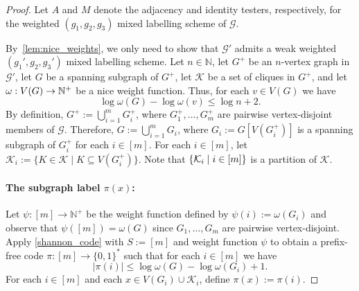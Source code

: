\documentclass{patmorin}
\renewcommand{\le}{\leqslant}
\newcommand{\NN}{\mathbb{N}}
\DeclarePairedDelimiter{\set}{\{}{\}}
\begin{document}
  \begin{proof}
    Let $A$ and $M$ denote the adjacency and identity testers, respectively, for the weighted $(g_1,g_2,g_3)$ mixed labelling scheme of $\mathcal{G}$.

    By~\cref{lem:nice_weights}, we only need to show that $\mathcal{G}'$ admits a weak weighted $(g_1',g_2,g_3')$ mixed labelling scheme.
    Let $n\in \NN$,
    let $G^+$ be an $n$-vertex graph in $\mathcal{G}'$,
    let $G$ be a spanning subgraph of $G^+$,
    let $\mathcal{K}$ be a set of cliques in $G^+$, and
    let $\omega:V(G)\to\mathbb{N}^+$ be a nice weight function.
    Thus, for each $v\in V(G)$ we have
    \begin{equation}
    \label{eq:nice}
    \log\omega(G)-\log\omega(v)\le\log n + 2.
    \end{equation}
    By definition, $G^+:=\bigcup_{i=1}^m G^+_i$, where $G^+_1,\ldots,G^+_m$ are pairwise vertex-disjoint members of $\mathcal{G}$.
    Therefore, $G:=\bigcup_{i=1}^m G_i$, where $G_i:=G[V(G^+_i)]$ is a spanning subgraph of $G^+_i$ for each $i\in[m]$.
    For each $i\in[m]$, let $\mathcal{K}_i:=\{K\in\mathcal{K}\mid K\subseteq V(G^+_i)\}$.
    Note that $\set{\mathcal{K}_i\mid i\in[m]}$ is a partition of $\mathcal{K}$.

    \paragraph{\boldmath The subgraph label $\pi(x)$:}
    Let $\psi:[m]\to\NN^+$ be the weight function defined by $\psi(i):=\omega(G_i)$ and observe that $\psi([m])=\omega(G)$ since $G_1,\ldots,G_m$ are pairwise vertex-disjoint.
    Apply \cref{shannon_code} with $S:=[m]$ and weight function $\psi$ to obtain a prefix-free code $\pi:[m]\to\{0,1\}^*$ such that for each $i\in[m]$ we have
    \begin{equation}
    \label{eq:pi}
    |\pi(i)|\le\log \omega(G)-\log \omega(G_i)+1.
    \end{equation}
    For each $i\in[m]$ and each $x\in V(G_i)\cup \mathcal{K}_i$, define $\pi(x):=\pi(i)$.


\end{proof}
\end{document}
